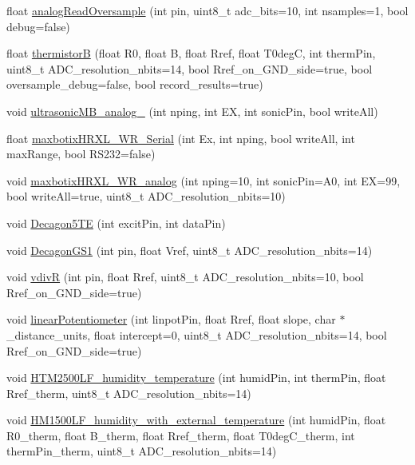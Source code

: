 \begin{DoxyCompactItemize}
\item 
float \hyperlink{classLogger_ad8296890a14a0df83c2433a20f25b899}{analog\+Read\+Oversample} (int pin, uint8\+\_\+t adc\+\_\+bits=10, int nsamples=1, bool debug=false)
\item 
float \hyperlink{classLogger_a55d923b98a6c503fccb25bfd4af32f3d}{thermistorB} (float R0, float B, float Rref, float T0degC, int therm\+Pin, uint8\+\_\+t A\+D\+C\+\_\+resolution\+\_\+nbits=14, bool Rref\+\_\+on\+\_\+\+G\+N\+D\+\_\+side=true, bool oversample\+\_\+debug=false, bool record\+\_\+results=true)
\item 
void \hyperlink{classLogger_a362a1462166d63ddc613eaa1e86f9854}{ultrasonic\+M\+B\+\_\+analog\+\_\+1cm} (int nping, int EX, int sonic\+Pin, bool write\+All)
\item 
float \hyperlink{classLogger_a87ce56cb9c3dfc7abfd6308b2ee7dc10}{maxbotix\+H\+R\+X\+L\+\_\+\+W\+R\+\_\+\+Serial} (int Ex, int nping, bool write\+All, int max\+Range, bool R\+S232=false)
\item 
void \hyperlink{classLogger_a3ce2869bbd48fdebbf44e155981c85b0}{maxbotix\+H\+R\+X\+L\+\_\+\+W\+R\+\_\+analog} (int nping=10, int sonic\+Pin=A0, int EX=99, bool write\+All=true, uint8\+\_\+t A\+D\+C\+\_\+resolution\+\_\+nbits=10)
\item 
void \hyperlink{classLogger_a40ae372dee7f672a6d6f33ab441e4da1}{Decagon5\+TE} (int excit\+Pin, int data\+Pin)
\item 
void \hyperlink{classLogger_a84da6a9ec3d4d56fdc32d950b71f1a26}{Decagon\+G\+S1} (int pin, float Vref, uint8\+\_\+t A\+D\+C\+\_\+resolution\+\_\+nbits=14)
\item 
void \hyperlink{classLogger_ab1ae31b2bdb77c86fb6851907258171b}{vdivR} (int pin, float Rref, uint8\+\_\+t A\+D\+C\+\_\+resolution\+\_\+nbits=10, bool Rref\+\_\+on\+\_\+\+G\+N\+D\+\_\+side=true)
\item 
void \hyperlink{classLogger_a95670d06ec3b68300895cd7bf8c37999}{linear\+Potentiometer} (int linpot\+Pin, float Rref, float slope, char $\ast$\+\_\+distance\+\_\+units, float intercept=0, uint8\+\_\+t A\+D\+C\+\_\+resolution\+\_\+nbits=14, bool Rref\+\_\+on\+\_\+\+G\+N\+D\+\_\+side=true)
\item 
void \hyperlink{classLogger_a4ccff7a14a6bddc8bb28e22b3b36d3cc}{H\+T\+M2500\+L\+F\+\_\+humidity\+\_\+temperature} (int humid\+Pin, int therm\+Pin, float Rref\+\_\+therm, uint8\+\_\+t A\+D\+C\+\_\+resolution\+\_\+nbits=14)
\item 
void \hyperlink{classLogger_a62b74ddb3cf9fdd7dae2394c1b245ed4}{H\+M1500\+L\+F\+\_\+humidity\+\_\+with\+\_\+external\+\_\+temperature} (int humid\+Pin, float R0\+\_\+therm, float B\+\_\+therm, float Rref\+\_\+therm, float T0deg\+C\+\_\+therm, int therm\+Pin\+\_\+therm, uint8\+\_\+t A\+D\+C\+\_\+resolution\+\_\+nbits=14)

\end{DoxyCompactItemize}
